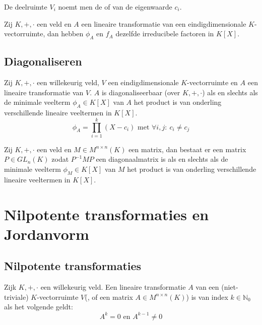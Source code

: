 \documentclass[main.tex]{subfiles}
\begin{document}
\begin{de}
  De deelruimte $V_{i}$ noemt men de  of  van de eigenwaarde $c_{i}$.
\end{de}

\begin{ei}
  Zij $K,+,\cdot$ een veld en $A$ een lineaire transformatie van een eindigdimensionale $K$-vectorruimte, dan hebben $\phi_{A}$ en $f_{A}$ dezelfde irreducibele factoren in $K[X]$.
\end{ei}

\subsection{Diagonaliseren}
\label{sec:diagonaliseren}

\begin{st}
\examen
  Zij $K,+,\cdot$ een willekeurig veld, $V$ een eindigdimensionale $K$-vectorruimte en $A$ een lineaire transformatie van $V$.
  $A$ is diagonaliseerbaar (over $K,+,\cdot$) als en slechts als de minimale veelterm $\phi_{A}\in K[X]$ van $A$ het product is van onderling verschillende lineaire veeltermen in $K[X]$.
  \[ \phi_{A} = \prod_{i=1}^{k}(X-c_{i}) \text{ met } \forall i,j:\ c_{i} \neq c_{j} \]
\end{st}

\begin{ei}
  Zij $K,+,\cdot$ een veld en $M\in M^{n\times n}(K)$ een matrix, dan bestaat er een matrix $P \in GL_{n}(K)$ zodat $P^{-1}MP$ een diagonaalmatrix is als en slechts als de minimale veelterm $\phi_{M}\in K[X]$ van $M$ het product is van onderling verschillende lineaire veeltermen in $K[X]$.
\end{ei}

\section{Nilpotente transformaties en Jordanvorm}
\label{sec:nilp-transf-en}

\subsection{Nilpotente transformaties}
\label{sec:nilp-transf}

\begin{de}
  Zijk $K,+,\cdot$ een willekeurig veld.
  Een lineaire transformatie $A$ van een (niet-triviale) $K$-vectorruimte $V$(, of een matrix $A\in M^{n\times n}(K)$) is  van index $k\in \mathbb{N}_{0}$ als het volgende geldt:
  \[ A^{k} = 0 \text{ en } A^{k-1} \neq 0 \]
\end{de}
\end{document}
